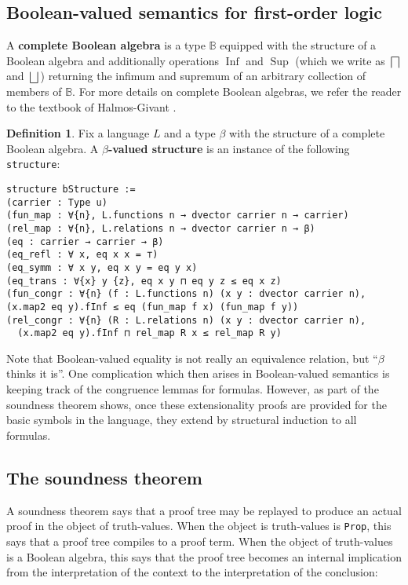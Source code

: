 \documentclass[a4paper,USenglish,cleveref, autoref]{lipics-v2019}
\newcommand{\B}{\mathbb{B}}
\newcommand{\lil}{\lstinline}
\theoremstyle{definition}
\newtheorem{defn}[theorem]{Definition}
\begin{document}
\subsection{Boolean-valued semantics for first-order logic}

A \textbf{complete Boolean algebra} is a type $\B$ equipped with the structure of a Boolean algebra and additionally operations $\operatorname{Inf}$ and $\operatorname{Sup}$ (which we write as $\bigsqcap$ and $\bigsqcup$) returning the infimum and supremum of an arbitrary collection of members of $\B$. For more details on complete Boolean algebras, we refer the reader to the textbook of Halmos-Givant \cite{halmos-givant1}.

\begin{defn}\label{def-boolean-valued-structure}
  Fix a language $L$ and a type $\beta$ with the structure of a complete Boolean algebra. A \textbf{$\beta$-valued structure} is an instance of the following \lil{structure}:
  \begin{lstlisting}
structure bStructure :=
(carrier : Type u)
(fun_map : ∀{n}, L.functions n → dvector carrier n → carrier)
(rel_map : ∀{n}, L.relations n → dvector carrier n → β)
(eq : carrier → carrier → β)
(eq_refl : ∀ x, eq x x = ⊤)
(eq_symm : ∀ x y, eq x y = eq y x)
(eq_trans : ∀{x} y {z}, eq x y ⊓ eq y z ≤ eq x z)
(fun_congr : ∀{n} (f : L.functions n) (x y : dvector carrier n),
(x.map2 eq y).fInf ≤ eq (fun_map f x) (fun_map f y))
(rel_congr : ∀{n} (R : L.relations n) (x y : dvector carrier n),
  (x.map2 eq y).fInf ⊓ rel_map R x ≤ rel_map R y)
  \end{lstlisting}
\end{defn}

Note that Boolean-valued equality is not really an equivalence relation, but ``$\beta$ thinks it is''. One complication which then arises in Boolean-valued semantics is keeping track of the congruence lemmas for formulas. However, as part of the soundness theorem shows, once these extensionality proofs are provided for the basic symbols in the language, they extend by structural induction to all formulas.

\subsection{The soundness theorem}

A soundness theorem says that a proof tree may be replayed to produce an actual proof in the object of truth-values. When the object is truth-values is \lil{Prop}, this says that a proof tree compiles to a proof term. When the object of truth-values is a Boolean algebra, this says that the proof tree becomes an internal implication from the interpretation of the context to the interpretation of the conclusion:
\end{document}
